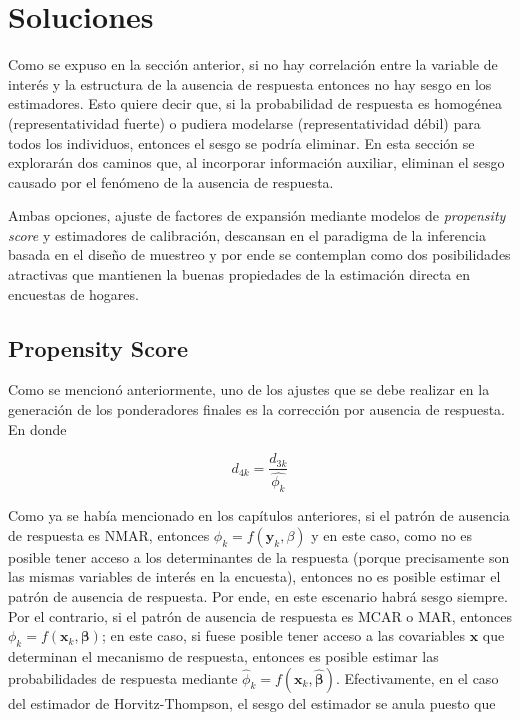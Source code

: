 \documentclass[
  12pt,
]{book}
\begin{document}
\hypertarget{soluciones}{%
\section{Soluciones}\label{soluciones}}

Como se expuso en la sección anterior, si no hay correlación entre la variable de interés y la estructura de la ausencia de respuesta entonces no hay sesgo en los estimadores. Esto quiere decir que, si la probabilidad de respuesta es homogénea (representatividad fuerte) o pudiera modelarse (representatividad débil) para todos los individuos, entonces el sesgo se podría eliminar. En esta sección se explorarán dos caminos que, al incorporar información auxiliar, eliminan el sesgo causado por el fenómeno de la ausencia de respuesta.

Ambas opciones, ajuste de factores de expansión mediante modelos de \emph{propensity score} y estimadores de calibración, descansan en el paradigma de la inferencia basada en el diseño de muestreo y por ende se contemplan como dos posibilidades atractivas que mantienen la buenas propiedades de la estimación directa en encuestas de hogares.

\hypertarget{propensity-score}{%
\subsection{Propensity Score}\label{propensity-score}}

Como se mencionó anteriormente, uno de los ajustes que se debe realizar en la generación de los ponderadores finales es la corrección por ausencia de respuesta. En donde

\[d_{4k} =  \frac{d_{3k}}{\hat{\phi_k}}\]

Como ya se había mencionado en los capítulos anteriores, si el patrón de ausencia de respuesta es NMAR, entonces \(\phi_k = f(\mathbf{y}_k, \beta)\) y en este caso, como no es posible tener acceso a los determinantes de la respuesta (porque precisamente son las mismas variables de interés en la encuesta), entonces no es posible estimar el patrón de ausencia de respuesta. Por ende, en este escenario habrá sesgo siempre. Por el contrario, si el patrón de ausencia de respuesta es MCAR o MAR, entonces \(\phi_k = f(\mathbf{x}_k, \boldsymbol{\beta})\); en este caso, si fuese posible tener acceso a las covariables \(\mathbf{x}\) que determinan el mecanismo de respuesta, entonces es posible estimar las probabilidades de respuesta mediante \(\hat{\phi}_k = f(\mathbf{x}_k, \hat{\boldsymbol{\beta}})\). Efectivamente, en el caso del estimador de Horvitz-Thompson, el sesgo del estimador se anula puesto que
\end{document}
